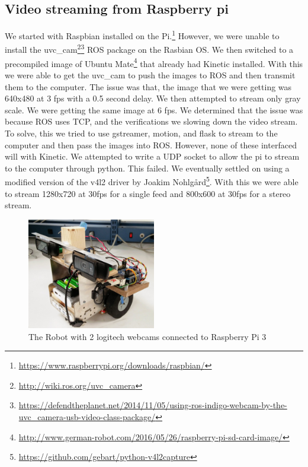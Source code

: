 \documentclass[10pt]{article}
\begin{document}
\subsection{Video streaming from Raspberry pi}
We started with Raspbian installed on the Pi.\footnote{\href{https://www.raspberrypi.org/downloads/raspbian/}{https://www.raspberrypi.org/downloads/raspbian/}} However, we were unable to install the uvc\_cam\footnote{\href{http://wiki.ros.org/uvc\_camera}{http://wiki.ros.org/uvc\_camera}}\footnote{\href{https://defendtheplanet.net/2014/11/05/using-ros-indigo-webcam-by-the-uvc\_camera-usb-video-class-package/}{https://defendtheplanet.net/2014/11/05/using-ros-indigo-webcam-by-the-uvc\_camera-usb-video-class-package/}} ROS package on the Rasbian OS. We then switched to a precompiled image of Ubuntu Mate\footnote{\href{http://www.german-robot.com/2016/05/26/raspberry-pi-sd-card-image/}{http://www.german-robot.com/2016/05/26/raspberry-pi-sd-card-image/}} that already had Kinetic installed. With this we were able to get the uvc\_cam to push the images to ROS and then transmit them to the computer. The issue was that, the image that we were getting was 640x480 at 3 fps with a 0.5 second delay. We then attempted to stream only gray scale. We were getting the same image at 6 fps. We determined that the issue was because ROS uses TCP, and the verifications we slowing down the video stream. To solve, this we tried to use gstreamer, motion, and flask to stream to the computer and then pass the images into ROS. However, none of these interfaced will with Kinetic. We attempted to write a UDP socket to allow the pi to stream to the computer through python. This failed. We eventually settled on using a modified version of the v4l2 driver by Joakim Nohlgård\footnote{\href{https://github.com/gebart/python-v4l2capture}{https://github.com/gebart/python-v4l2capture}}. With this we were able to stream 1280x720 at 30fps for a single feed and  800x600 at 30fps for a stereo stream. 
\begin{figure}[!h]
\centering \includegraphics[width=0.5\textwidth]{Bot.jpg}
\caption{The Robot with 2 logitech webcams connected to  Raspberry Pi 3}
\end{figure}
\end{document}
